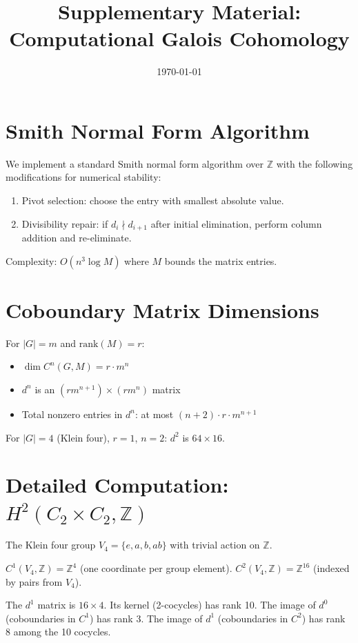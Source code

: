 \documentclass[11pt,a4paper]{article}
\title{Supplementary Material:\\
  Computational Galois Cohomology}
\author{}
\date{\today}
\begin{document}
\maketitle

\section{Smith Normal Form Algorithm}\label{sec:snf}

We implement a standard Smith normal form algorithm over $\mathbb{Z}$
with the following modifications for numerical stability:
\begin{enumerate}
  \item Pivot selection: choose the entry with smallest absolute value.
  \item Divisibility repair: if $d_i \nmid d_{i+1}$ after initial
    elimination, perform column addition and re-eliminate.
\end{enumerate}

Complexity: $O(n^3 \log M)$ where $M$ bounds the matrix entries.

\section{Coboundary Matrix Dimensions}\label{sec:dimensions}

For $|G| = m$ and $\text{rank}(M) = r$:
\begin{itemize}
  \item $\dim C^n(G, M) = r \cdot m^n$
  \item $d^n$ is an $(r m^{n+1}) \times (r m^n)$ matrix
  \item Total nonzero entries in $d^n$: at most $(n+2) \cdot r \cdot m^{n+1}$
\end{itemize}

For $|G| = 4$ (Klein four), $r = 1$, $n = 2$: $d^2$ is $64 \times 16$.

\section{Detailed Computation: $H^2(C_2 \times C_2, \mathbb{Z})$}

The Klein four group $V_4 = \{e, a, b, ab\}$ with trivial action on $\mathbb{Z}$.

$C^1(V_4, \mathbb{Z}) = \mathbb{Z}^4$ (one coordinate per group element).
$C^2(V_4, \mathbb{Z}) = \mathbb{Z}^{16}$ (indexed by pairs from $V_4$).

The $d^1$ matrix is $16 \times 4$. Its kernel (2-cocycles) has rank 10.
The image of $d^0$ (coboundaries in $C^1$) has rank 3.
The image of $d^1$ (coboundaries in $C^2$) has rank 8 among the 10 cocycles.
\end{document}
